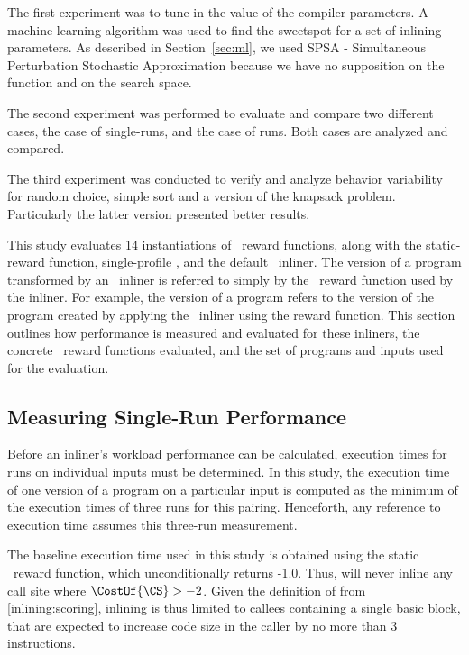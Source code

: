 
\def\graphwidth{0.9\linewidth}

The first experiment was to tune in the value of the compiler parameters.
 A machine learning algorithm was used to find the sweetspot for a set of
 inlining parameters. As described in Section~\ref{sec:ml}, we used
 SPSA - Simultaneous Perturbation Stochastic Approximation because we have no
 supposition on the function and on the search space.

The second experiment was performed to evaluate and compare two different cases,
 the case of single-runs, and the case of \CP\-runs. Both cases are analyzed and
 compared.

The third experiment was conducted to verify and 
  analyze behavior variability for random choice, simple sort and
  a version of the knapsack problem. Particularly the latter version presented better results.


This study evaluates 14 instantiations of \FDI\ reward functions,
along with the  static-reward function,
single-profile \FDO, and the default \llvm\ inliner.  The version of a
program transformed by an \FDI\ inliner is referred to simply by
the \FDI\ reward function used by the inliner.  For example,
the  version of a program refers to the version of the
program created by applying the \FDI\ inliner using
the  reward function.  This section outlines how
performance is measured and evaluated for these inliners, the
concrete \FDI\ reward functions evaluated, and the set of programs and
inputs used for the evaluation.


\subsection{Measuring Single-Run Performance}

Before an inliner's workload performance can be calculated, execution
times for runs on individual inputs must be determined.  In this
study, the execution time of one version of a program on a particular
input is computed as the 
minimum of the execution times of three runs for this pairing.
Henceforth, any reference to execution time assumes this three-run
measurement.

The baseline execution time used in this study is obtained using
the  static \FDI\ reward function, which
unconditionally returns -1.0.  Thus,  will never
inline any call site where $\CostOf{\CS} > -2$.  Given the definition
of \CostOf{\CS} from \ref{inlining:scoring}, inlining is thus
limited to callees containing a single basic block, that are expected
to increase code size in the caller by no more than 3 instructions.

